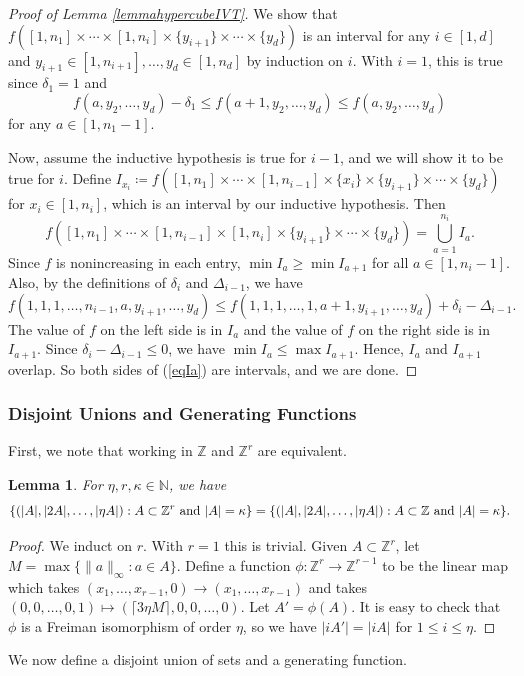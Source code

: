 \documentclass{daj}
\newtheorem{lemma}[theorem]{Lemma}
\theoremstyle{definition}
\theoremstyle{remark}
\numberwithin{equation}{section}
\numberwithin{theorem}{section}
\newcommand{\N}{\mathbb{N}}
\newcommand{\Z}{\mathbb{Z}}
\begin{document}
\begin{proof}[Proof of Lemma \ref{lemmahypercubeIVT}]
    We show that $f([1,n_1]\times \cdots \times [1,n_i] \times \{y_{i+1}\}\times \cdots \times \{y_d\})$ is an interval for any $i \in [1,d]$ and $y_{i+1} \in [1,n_{i+1}],\ldots,y_d\in[1,n_d]$ by induction on $i$. With $i = 1$, this is true since $\delta_1=1$ and \[f(a,y_2,\ldots,y_d) - \delta_1 \leq f(a+1,y_2,\ldots,y_d) \leq f(a,y_2,\ldots,y_d)\] for any $a\in [1,n_{1}-1].$ 
    
    Now, assume the inductive hypothesis is true for $i-1$, and we will show it to be true for $i$. Define $I_{x_{i}} \coloneq  f([1,n_1]\times \cdots \times [1,n_{i-1}] \times \{x_{i}\}\times \{y_{i+1}\}\times \cdots \times \{y_d\})$ for $x_{i} \in [1,n_{i}]$, which is an interval by our inductive hypothesis. Then \begin{equation}\label{eqIa}
        f([1,n_1]\times \cdots \times [1,n_{i-1}] \times [1,n_{i}] \times \{y_{i+1}\} \times \cdots \times \{y_d\}) = \bigcup_{a=1}^{n_{i}} I_{a}.
    \end{equation} Since $f$ is nonincreasing in each entry, $\min I_{a} \geq \min I_{a+1}$ for all $a \in [1,n_{i}-1]$. Also, by the definitions of $\delta_{i}$ and $\Delta_{i-1}$, we have \[ f(1,1,1,\ldots,n_{i-1},a,y_{i+1},\ldots,y_{d}) \leq f(1,1,1,\ldots,1,a+1,y_{i+1},\ldots,y_{d})+\delta_{i}-\Delta_{i-1}.\] The value of $f$ on the left side is in $I_a$ and the value of $f$ on the right side is in $I_{a+1}$. Since $\delta_{i}-\Delta_{i-1} \leq 0$, we have $\min I_{a} \leq \max I_{a+1}$. Hence, $I_a$ and $I_{a+1}$ overlap. So both sides of (\ref{eqIa}) are intervals, and we are done.
\end{proof}
\subsubsection{Disjoint Unions and Generating Functions}\label{sssection: disjointunions}
First, we note that working in $\Z$ and $\Z^r$ are equivalent.
\begin{lemma}\label{lemmadimension}
    For $\eta, r, \kappa \in \N$, we have \[\{(|A|,|2A|,\ldots,|\eta A|):A \subset 
    \Z^r \textnormal{ and } |A| = \kappa \} = \{(|A|,|2A|,\ldots,|\eta A|):A \subset \Z \textnormal{ and }  |A| = 
\kappa \}.\]
\end{lemma}
\begin{proof}
We induct on $r$. With $r = 1$ this is trivial. Given $A \subset \Z^{r}$, let $M = \max\{\|a\|_\infty:a \in A\}$. Define a function $\phi: \Z^r \to \Z^{r-1}$ to be the linear map which takes $(x_1,\ldots,x_{r-1},0) \to (x_1,\ldots,x_{r-1})$ and takes ${(0,0,\ldots,0,1) \mapsto (\lceil 3\eta M\rceil,0,0,\ldots,0)}$. Let $A' = \phi(A)$. It is easy to check that $\phi$ is a Freiman isomorphism of order $\eta$, so we have $|iA'| = |iA|$ for $1 \leq i \leq \eta$.
\end{proof}
We now define a disjoint union of sets and a generating function.
\end{document}
